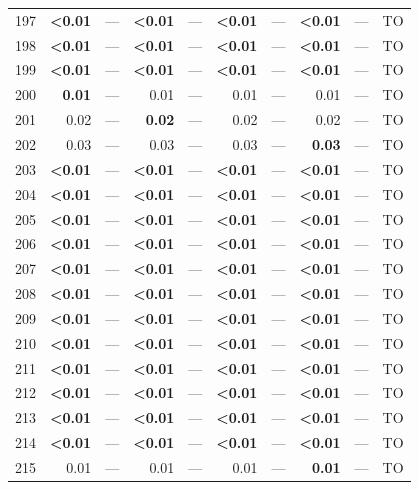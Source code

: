 \begin{longtable}{lr@{\hskip 4pt}l@{\hskip 12pt}r@{\hskip 4pt}l@{\hskip 12pt}r@{\hskip 4pt}l@{\hskip 12pt}r@{\hskip 4pt}l@{\hskip 12pt}r}
197 & \textbf{<0.01} & --- & \textbf{<0.01} & --- & \textbf{<0.01} & --- & \textbf{<0.01} & --- & TO \\
198 & \textbf{<0.01} & --- & \textbf{<0.01} & --- & \textbf{<0.01} & --- & \textbf{<0.01} & --- & TO \\
199 & \textbf{<0.01} & --- & \textbf{<0.01} & --- & \textbf{<0.01} & --- & \textbf{<0.01} & --- & TO \\
200 & \textbf{0.01} & --- & 0.01 & --- & 0.01 & --- & 0.01 & --- & TO \\
201 & 0.02 & --- & \textbf{0.02} & --- & 0.02 & --- & 0.02 & --- & TO \\
202 & 0.03 & --- & 0.03 & --- & 0.03 & --- & \textbf{0.03} & --- & TO \\
203 & \textbf{<0.01} & --- & \textbf{<0.01} & --- & \textbf{<0.01} & --- & \textbf{<0.01} & --- & TO \\
204 & \textbf{<0.01} & --- & \textbf{<0.01} & --- & \textbf{<0.01} & --- & \textbf{<0.01} & --- & TO \\
205 & \textbf{<0.01} & --- & \textbf{<0.01} & --- & \textbf{<0.01} & --- & \textbf{<0.01} & --- & TO \\
206 & \textbf{<0.01} & --- & \textbf{<0.01} & --- & \textbf{<0.01} & --- & \textbf{<0.01} & --- & TO \\
207 & \textbf{<0.01} & --- & \textbf{<0.01} & --- & \textbf{<0.01} & --- & \textbf{<0.01} & --- & TO \\
208 & \textbf{<0.01} & --- & \textbf{<0.01} & --- & \textbf{<0.01} & --- & \textbf{<0.01} & --- & TO \\
209 & \textbf{<0.01} & --- & \textbf{<0.01} & --- & \textbf{<0.01} & --- & \textbf{<0.01} & --- & TO \\
210 & \textbf{<0.01} & --- & \textbf{<0.01} & --- & \textbf{<0.01} & --- & \textbf{<0.01} & --- & TO \\
211 & \textbf{<0.01} & --- & \textbf{<0.01} & --- & \textbf{<0.01} & --- & \textbf{<0.01} & --- & TO \\
212 & \textbf{<0.01} & --- & \textbf{<0.01} & --- & \textbf{<0.01} & --- & \textbf{<0.01} & --- & TO \\
213 & \textbf{<0.01} & --- & \textbf{<0.01} & --- & \textbf{<0.01} & --- & \textbf{<0.01} & --- & TO \\
214 & \textbf{<0.01} & --- & \textbf{<0.01} & --- & \textbf{<0.01} & --- & \textbf{<0.01} & --- & TO \\
215 & 0.01 & --- & 0.01 & --- & 0.01 & --- & \textbf{0.01} & --- & TO \\

\end{longtable}
